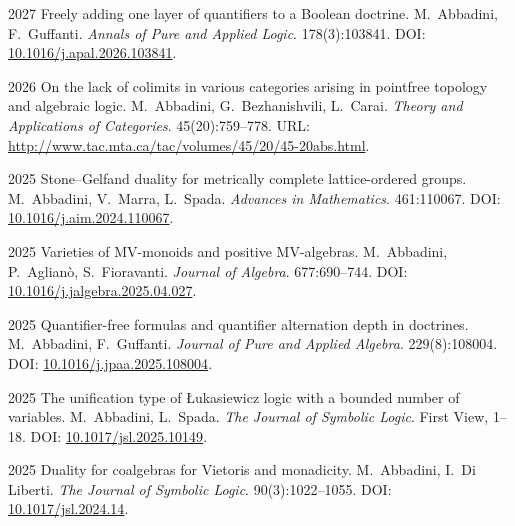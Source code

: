 


\pubrow
  {2027}
  {Freely adding one layer of quantifiers to a Boolean doctrine.}
  {M.\ Abbadini, F.\ Guffanti.}
  {\emph{Annals of Pure and Applied Logic}. 178(3):103841. DOI: \href{https://doi.org/10.1016/j.apal.2026.103841}{10.1016/j.apal.2026.103841}.}

\pubrow
  {2026}
  {On the lack of colimits in various categories arising in pointfree topology and algebraic logic.}
  {M.\ Abbadini, G.\ Bezhanishvili, L.\ Carai.}
  {\emph{Theory and Applications of Categories}. 45(20):759--778. URL: \url{http://www.tac.mta.ca/tac/volumes/45/20/45-20abs.html}.}

\pubrow
  {2025}
  {Stone--Gelfand duality for metrically complete lattice-ordered groups.}
  {M.\ Abbadini, V.\ Marra, L.\ Spada.}
  {\emph{Advances in Mathematics}. 461:110067. DOI: \href{https://doi.org/10.1016/j.aim.2024.110067}{10.1016/j.aim.2024.110067}.}

\pubrow
  {2025}
  {Varieties of MV-monoids and positive MV-algebras.}
  {M.\ Abbadini, P.\ Aglian\`o, S.\ Fioravanti.}
  {\emph{Journal of Algebra}. 677:690--744. DOI: \href{https://doi.org/10.1016/j.jalgebra.2025.04.027}{10.1016/j.jalgebra.2025.04.027}.}

\pubrow
  {2025}
  {Quantifier-free formulas and quantifier alternation depth in doctrines.}
  {M.\ Abbadini, F.\ Guffanti.}
  {\emph{Journal of Pure and Applied Algebra}. 229(8):108004. DOI: \href{https://doi.org/10.1016/j.jpaa.2025.108004}{10.1016/j.jpaa.2025.108004}.}

\pubrow
  {2025}
  {The unification type of {\L}ukasiewicz logic with a bounded number of variables.}
  {M.\ Abbadini, L.\ Spada.}
  {\emph{The Journal of Symbolic Logic}. First View, 1--18. DOI: \href{https://doi.org/10.1017/jsl.2025.10149}{10.1017/jsl.2025.10149}.}

\pubrow
  {2025}
  {Duality for coalgebras for Vietoris and monadicity.}
  {M.\ Abbadini, I.\ Di Liberti.}
  {\emph{The Journal of Symbolic Logic}. 90(3):1022--1055. DOI: \href{https://doi.org/10.1017/jsl.2024.14}{10.1017/jsl.2024.14}.}

